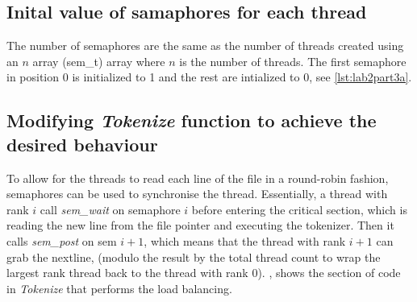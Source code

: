 \subsection{Inital value of samaphores for each thread}

The number of semaphores are the same as the number of threads created using an $n$ array (sem\_t) array
where $n$ is the number of threads. The first semaphore in position $0$ is initialized to 1 and the rest
are intialized to 0, see \cref{lst:lab2part3a}.

\pagebreak
\vspace{0.5cm}



\subsection{Modifying \emph{Tokenize} function to achieve the desired behaviour}

To allow for the threads to read each line of the file in a round-robin fashion, semaphores can be used
to synchronise the thread. Essentially, a thread with rank $i$ call \emph{sem\_wait} on semaphore $i$ before
entering the critical section, which is reading the new line from the file pointer and executing the 
tokenizer. Then it calls \emph{sem\_post} on sem $i+1$, which means that the thread with rank $i+1$ can 
grab the nextline, (modulo the result by the total thread count to wrap the largest rank thread
back to the thread with rank 0). , shows the section of code in \emph{Tokenize} that
performs the load balancing.

\pagebreak
\vspace{0.5cm}


